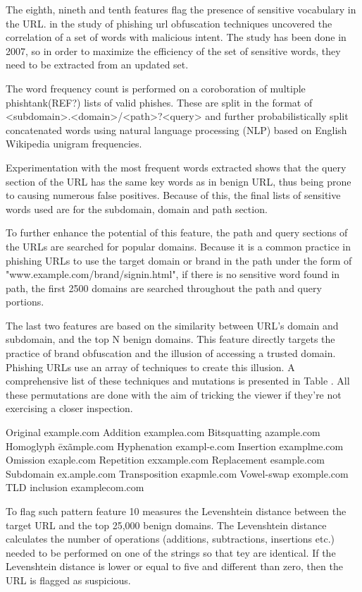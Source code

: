 The eighth, nineth and tenth features flag the presence of sensitive vocabulary in the URL. \cite{10.1145/1314389.1314391} in the study of phishing url obfuscation techniques uncovered the correlation of a set of words with malicious intent. The study has been done in 2007, so in order to maximize the efficiency of the set of sensitive words, they need to be extracted from an updated set.

The word frequency count is performed on a coroboration of multiple phishtank(REF?) lists of valid phishes. These are split in the format of <subdomain>.<domain>/<path>?<query> and further probabilistically split concatenated words using natural language processing (NLP) based on English Wikipedia unigram frequencies.

Experimentation with the most frequent words extracted shows that the query section of the URL has the same key words as in benign URL, thus being prone to causing numerous false positives. Because of this, the final lists of sensitive words used are for the subdomain, domain and path section.

To further enhance the potential of this feature, the path and query sections of the URLs are searched for popular domains. Because it is a common practice in phishing URLs to use the target domain or brand in the path under the form of "www.example.com/brand/signin.html", if there is no sensitive word found in path, the first 2500 domains are searched throughout the path and query portions.

The last two features are based on the similarity between URL's domain and subdomain, and the top N benign domains. This feature directly targets the practice of brand obfuscation and the illusion of accessing a trusted domain.
Phishing URLs use an array of techniques to create this illusion. A comprehensive list of these techniques and mutations is presented in Table . All these permutations are done with the aim of tricking the viewer if they're not exercising a closer inspection.


Original example.com
Addition examplea.com
Bitsquatting azample.com
Homoglyph ēxãmple.com
Hyphenation exampl-e.com
Insertion examplme.com
Omission exaple.com
Repetition exxample.com
Replacement esample.com
Subdomain ex.ample.com
Transposition exapmle.com
Vowel-swap exomple.com
TLD inclusion examplecom.com

To flag such pattern feature 10 measures the Levenshtein distance between the target URL and the top 25,000 benign domains. The Levenshtein distance calculates the number of operations (additions, subtractions, insertions etc.) needed to be performed on one of the strings so that tey are identical. If the Levenshtein distance is lower or equal to five and different than zero, then the URL is flagged as suspicious.

